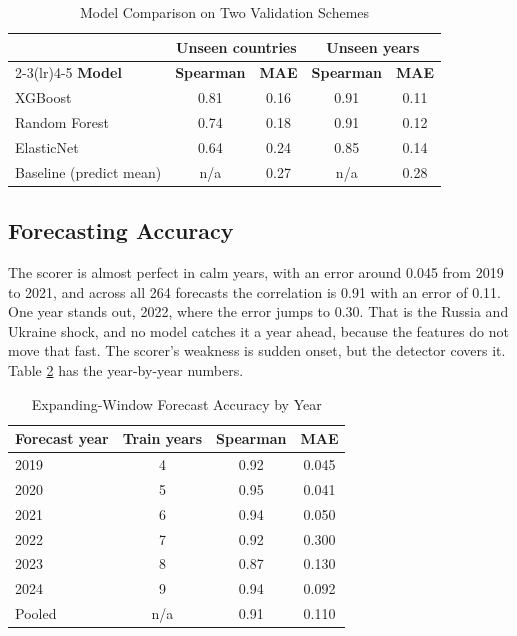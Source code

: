 \documentclass[stu,12pt,floatsintext]{apa7}
\begin{document}
\begin{table}[H]
\caption{Model Comparison on Two Validation Schemes}
\label{tab:models}
\centering
\begin{tabular}{lcccc}
\toprule
& \multicolumn{2}{c}{\textbf{Unseen countries}} & \multicolumn{2}{c}{\textbf{Unseen years}} \\
\cmidrule(lr){2-3}\cmidrule(lr){4-5}
\textbf{Model} & \textbf{Spearman} & \textbf{MAE} & \textbf{Spearman} & \textbf{MAE} \\
\midrule
XGBoost & 0.81 & 0.16 & 0.91 & 0.11 \\
Random Forest & 0.74 & 0.18 & 0.91 & 0.12 \\
ElasticNet & 0.64 & 0.24 & 0.85 & 0.14 \\
Baseline (predict mean) & n/a & 0.27 & n/a & 0.28 \\
\bottomrule
\end{tabular}
\end{table}

\subsection{Forecasting Accuracy}
The scorer is almost perfect in calm years, with an error around 0.045 from 2019 to 2021, and across all 264 forecasts the correlation is 0.91 with an error of 0.11. One year stands out, 2022, where the error jumps to 0.30. That is the Russia and Ukraine shock, and no model catches it a year ahead, because the features do not move that fast. The scorer's weakness is sudden onset, but the detector covers it. Table \ref{tab:years} has the year-by-year numbers.

\begin{table}[H]
\caption{Expanding-Window Forecast Accuracy by Year}
\label{tab:years}
\centering
\begin{tabular}{lccc}
\toprule
\textbf{Forecast year} & \textbf{Train years} & \textbf{Spearman} & \textbf{MAE} \\
\midrule
2019 & 4 & 0.92 & 0.045 \\
2020 & 5 & 0.95 & 0.041 \\
2021 & 6 & 0.94 & 0.050 \\
2022 & 7 & 0.92 & 0.300 \\
2023 & 8 & 0.87 & 0.130 \\
2024 & 9 & 0.94 & 0.092 \\
\midrule
Pooled & n/a & 0.91 & 0.110 \\
\bottomrule
\end{tabular}
\end{table}
\end{document}
